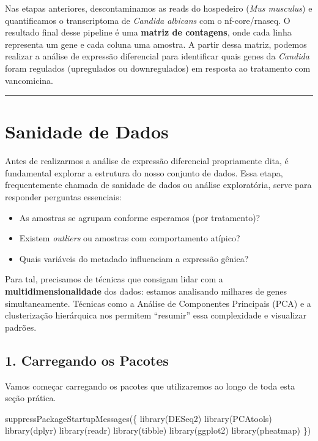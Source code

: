 \documentclass[
  letterpaper,
  DIV=11,
  numbers=noendperiod]{scrreprt}
\newenvironment{Shaded}{\begin{snugshade}}{\end{snugshade}}
\newcommand{\FunctionTok}[1]{\textcolor[rgb]{0.28,0.35,0.67}{#1}}
\newcommand{\NormalTok}[1]{\textcolor[rgb]{0.00,0.23,0.31}{#1}}
\providecommand{\tightlist}{%
  \setlength{\itemsep}{0pt}\setlength{\parskip}{0pt}}
\begin{document}
Nas etapas anteriores, descontaminamos as reads do hospedeiro (\emph{Mus
musculus}) e quantificamos o transcriptoma de \emph{Candida albicans}
com o nf-core/rnaseq. O resultado final desse pipeline é uma
\textbf{matriz de contagens}, onde cada linha representa um gene e cada
coluna uma amostra. A partir dessa matriz, podemos realizar a análise de
expressão diferencial para identificar quais genes da \emph{Candida}
foram regulados (upregulados ou downregulados) em resposta ao tratamento
com vancomicina.

\begin{center}\rule{0.5\linewidth}{0.5pt}\end{center}

\section{Sanidade de Dados}\label{sanidade-de-dados}

Antes de realizarmos a análise de expressão diferencial propriamente
dita, é fundamental explorar a estrutura do nosso conjunto de dados.
Essa etapa, frequentemente chamada de sanidade de dados ou análise
exploratória, serve para responder perguntas essenciais:

\begin{itemize}
\tightlist
\item
  As amostras se agrupam conforme esperamos (por tratamento)?
\item
  Existem \emph{outliers} ou amostras com comportamento atípico?
\item
  Quais variáveis do metadado influenciam a expressão gênica?
\end{itemize}

Para tal, precisamos de técnicas que consigam lidar com a
\textbf{multidimensionalidade} dos dados: estamos analisando milhares de
genes simultaneamente. Técnicas como a Análise de Componentes Principais
(PCA) e a clusterização hierárquica nos permitem ``resumir'' essa
complexidade e visualizar padrões.

\subsection{1. Carregando os Pacotes}\label{carregando-os-pacotes}

Vamos começar carregando os pacotes que utilizaremos ao longo de toda
esta seção prática.

\begin{Shaded}
\begin{Highlighting}[]
\FunctionTok{suppressPackageStartupMessages}\NormalTok{(\{}
  \FunctionTok{library}\NormalTok{(DESeq2)}
  \FunctionTok{library}\NormalTok{(PCAtools)}
  \FunctionTok{library}\NormalTok{(dplyr)}
  \FunctionTok{library}\NormalTok{(readr)}
  \FunctionTok{library}\NormalTok{(tibble)}
  \FunctionTok{library}\NormalTok{(ggplot2)}
  \FunctionTok{library}\NormalTok{(pheatmap)}
\NormalTok{\})}
\end{Highlighting}
\end{Shaded}
\end{document}
